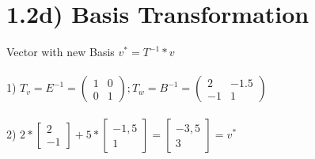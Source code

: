 \documentclass{article}
\begin{document}
	\section{1.2d) Basis Transformation}
	Vector with new Basis $v^* = T^{-1} * v$\\\\
	1) $T_v = E^{-1} = \begin{pmatrix}
		1 & 0\\
		0 & 1
	\end{pmatrix};
	T_w = B^{-1} = \begin{pmatrix}
		 2 & -1.5\\
		-1 & 1
	\end{pmatrix}$\\\\
	2) $2 * \begin{bmatrix}
		2 \\
		-1
	\end{bmatrix}
	+ 5 * \begin{bmatrix}
		-1,5 \\
		 1
	\end{bmatrix}
	 = \begin{bmatrix}
	 	-3,5 \\
	 	 3
	 \end{bmatrix} = v^*$
\end{document}
